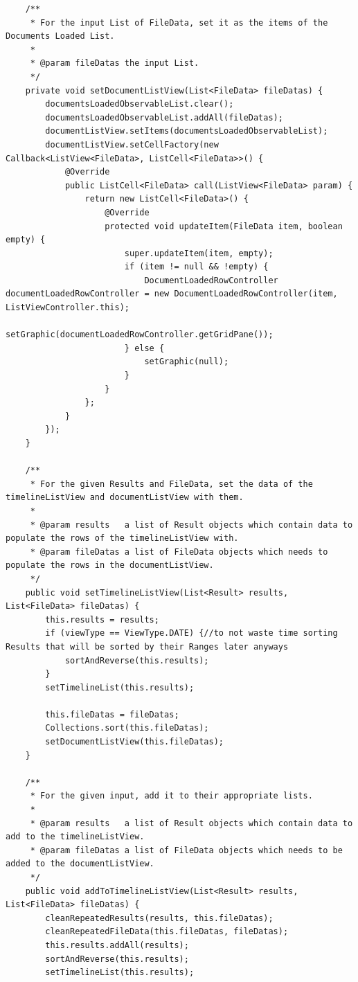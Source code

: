 \begin{lstlisting}
    /**
     * For the input List of FileData, set it as the items of the Documents Loaded List.
     *
     * @param fileDatas the input List.
     */
    private void setDocumentListView(List<FileData> fileDatas) {
        documentsLoadedObservableList.clear();
        documentsLoadedObservableList.addAll(fileDatas);
        documentListView.setItems(documentsLoadedObservableList);
        documentListView.setCellFactory(new Callback<ListView<FileData>, ListCell<FileData>>() {
            @Override
            public ListCell<FileData> call(ListView<FileData> param) {
                return new ListCell<FileData>() {
                    @Override
                    protected void updateItem(FileData item, boolean empty) {
                        super.updateItem(item, empty);
                        if (item != null && !empty) {
                            DocumentLoadedRowController documentLoadedRowController = new DocumentLoadedRowController(item, ListViewController.this);
                            setGraphic(documentLoadedRowController.getGridPane());
                        } else {
                            setGraphic(null);
                        }
                    }
                };
            }
        });
    }

    /**
     * For the given Results and FileData, set the data of the timelineListView and documentListView with them.
     *
     * @param results   a list of Result objects which contain data to populate the rows of the timelineListView with.
     * @param fileDatas a list of FileData objects which needs to populate the rows in the documentListView.
     */
    public void setTimelineListView(List<Result> results, List<FileData> fileDatas) {
        this.results = results;
        if (viewType == ViewType.DATE) {//to not waste time sorting Results that will be sorted by their Ranges later anyways
            sortAndReverse(this.results);
        }
        setTimelineList(this.results);

        this.fileDatas = fileDatas;
        Collections.sort(this.fileDatas);
        setDocumentListView(this.fileDatas);
    }

    /**
     * For the given input, add it to their appropriate lists.
     *
     * @param results   a list of Result objects which contain data to add to the timelineListView.
     * @param fileDatas a list of FileData objects which needs to be added to the documentListView.
     */
    public void addToTimelineListView(List<Result> results, List<FileData> fileDatas) {
        cleanRepeatedResults(results, this.fileDatas);
        cleanRepeatedFileData(this.fileDatas, fileDatas);
        this.results.addAll(results);
        sortAndReverse(this.results);
        setTimelineList(this.results);


\end{lstlisting}
